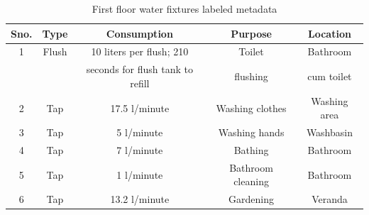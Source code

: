 \documentclass[10pt]{sensys-proc}
\begin{document}
\begin{table}
\tabcolsep=0.015cm
\vspace{-4mm}
\caption{First floor water fixtures labeled metadata}
\vspace{-4mm}
\label{tab:water_consumption_labeled}
\footnotesize
\begin{tabular}{|c|c|c|c|c|}
\hline
\textbf{Sno.}&\textbf{Type}&\textbf{Consumption}&\textbf{Purpose}&\textbf{Location}\\
\hline
1&Flush&10 liters per flush; 210&Toilet&Bathroom\\
 &&seconds for flush tank to refill&flushing&cum toilet\\ \hline
2&Tap&17.5 l/minute&Washing clothes&Washing area\\ \hline
3&Tap&5 l/minute&Washing hands&Washbasin\\ \hline
4&Tap&7 l/minute&Bathing&Bathroom\\ \hline
5&Tap&1 l/minute&Bathroom cleaning&Bathroom\\ \hline
6&Tap&13.2 l/minute&Gardening&Veranda\\ \hline

\end{tabular}
\vspace{-6mm}
\end{table}
\end{document}
